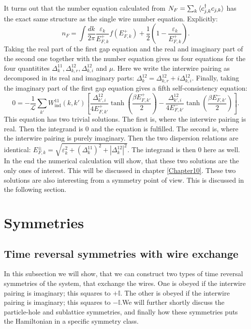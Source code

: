 It turns out that the number equation calculated from $N_F = \sum_k \braket{c^\dagger_{j,k}c_{j,k}}$ has the exact same structure as the single wire number equation. Explicitly: 
\begin{equation}
n_F = \int \frac{dk}{2\pi} \frac{\varepsilon_k}{E^{+}_{F,k}}f(E^{+}_{F,k}) + \frac{1}{2}\left(1 - \frac{\varepsilon_k}{E^{+}_{F,k}}\right). 
\label{eq.2wiresnumberequation}
\end{equation}
Taking the real part of the first gap equation and the real and imaginary part of the second one together with the number equation gives us four equations for the four quantitites $\Delta^{11}_k, \Delta^{12}_{k,r}, \Delta^{12}_{k,i} $ and $\mu$. Here we write the interwire pairing as decomposed in its real and imaginary parts: $\Delta^{12}_k = \Delta^{12}_{k,r} + i\Delta^{12}_{k,i}$. Finally, taking the imaginary part of the first gap equation gives a fifth self-consistency equation:
\begin{equation}
0 = -\frac{1}{\mathcal{L}}\sum_{k'} W_{\text{ind}}^{11}(k, k')\left[\frac{\Delta^{12}_{k',i}}{4E^{+}_{F,k'}}\tanh\left(\frac{\beta E^{+}_{F,k'}}{2}\right) - \frac{\Delta^{12}_{k',i}}{4E^{-}_{F,k'}}\tanh\left(\frac{\beta E^{-}_{F,k'}}{2}\right)\right].
\end{equation}
This equation has two trivial solutions. The first is, where the interwire pairing is real. Then the integrand is 0 and the equation is fulfilled. The second is, where the interwire pairing is purely imaginary. Then the two dispersion relations are identical: $E^{\pm}_{F,k} = \sqrt{\varepsilon_k^2 + (\Delta^{11}_k)^2 + |\Delta^{12}_k|^2}$. The integrand is then 0 here as well. In the end the numerical calculation will show, that these two solutions are the only ones of interest. This will be discussed in chapter \ref{Chapter10}. These two solutions are also interesting from a symmetry point of view. This is discussed in the following section.

\section{Symmetries}
\label{sec.2wiressymmetries}
\subsection{Time reversal symmetries with wire exchange}
In this subsection we will show, that we can construct two types of time reversal symmetries of the system, that exchange the wires. One is obeyed if the interwire pairing is imaginary; this squares to $+\mathbb{I}$. The other is obeyed if the interwire pairing is imaginary; this squares to $-\mathbb{I}$.We will further shortly discuss the particle-hole and sublattice symmetries, and finally how these symmetries puts the Hamiltonian in a specific symmetry class. 


